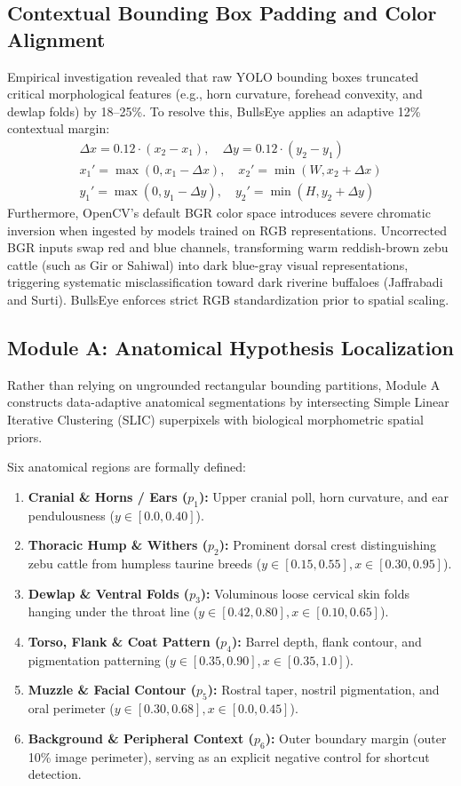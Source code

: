 \documentclass[conference]{IEEEtran}
\begin{document}
\subsection{Contextual Bounding Box Padding and Color Alignment}
Empirical investigation revealed that raw YOLO bounding boxes truncated critical morphological features (e.g., horn curvature, forehead convexity, and dewlap folds) by 18--25\%. To resolve this, BullsEye applies an adaptive 12\% contextual margin:
\begin{align}
\Delta x = 0.12 \cdot (x_2 - x_1), \quad \Delta y = 0.12 \cdot (y_2 - y_1) \\
x_1' = \max(0, x_1 - \Delta x), \quad x_2' = \min(W, x_2 + \Delta x) \\
y_1' = \max(0, y_1 - \Delta y), \quad y_2' = \min(H, y_2 + \Delta y)
\end{align}
Furthermore, OpenCV's default BGR color space introduces severe chromatic inversion when ingested by models trained on RGB representations. Uncorrected BGR inputs swap red and blue channels, transforming warm reddish-brown zebu cattle (such as Gir or Sahiwal) into dark blue-gray visual representations, triggering systematic misclassification toward dark riverine buffaloes (Jaffrabadi and Surti). BullsEye enforces strict RGB standardization prior to spatial scaling.

\subsection{Module A: Anatomical Hypothesis Localization}
Rather than relying on ungrounded rectangular bounding partitions, Module A constructs data-adaptive anatomical segmentations by intersecting Simple Linear Iterative Clustering (SLIC) superpixels with biological morphometric spatial priors.

Six anatomical regions are formally defined:
\begin{enumerate}
    \item \textbf{Cranial \& Horns / Ears ($p_1$):} Upper cranial poll, horn curvature, and ear pendulousness ($y \in [0.0, 0.40]$).
    \item \textbf{Thoracic Hump \& Withers ($p_2$):} Prominent dorsal crest distinguishing zebu cattle from humpless taurine breeds ($y \in [0.15, 0.55], x \in [0.30, 0.95]$).
    \item \textbf{Dewlap \& Ventral Folds ($p_3$):} Voluminous loose cervical skin folds hanging under the throat line ($y \in [0.42, 0.80], x \in [0.10, 0.65]$).
    \item \textbf{Torso, Flank \& Coat Pattern ($p_4$):} Barrel depth, flank contour, and pigmentation patterning ($y \in [0.35, 0.90], x \in [0.35, 1.0]$).
    \item \textbf{Muzzle \& Facial Contour ($p_5$):} Rostral taper, nostril pigmentation, and oral perimeter ($y \in [0.30, 0.68], x \in [0.0, 0.45]$).
    \item \textbf{Background \& Peripheral Context ($p_6$):} Outer boundary margin (outer 10\% image perimeter), serving as an explicit negative control for shortcut detection.
\end{enumerate}
\end{document}
